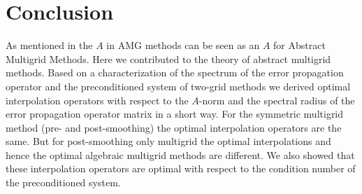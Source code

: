\documentclass[final]{siamltex}
\numberwithin{equation}{section}
\begin{document}
\section{Conclusion}
As mentioned in \cite{XuZ17} the  $A$ in AMG methods can be seen as an $A$ for 
Abstract 
Multigrid Methods. Here  we contributed to the  theory of  
abstract multigrid methods. Based on a characterization of the spectrum of the
error propagation operator and the preconditioned system of two-grid methods
we derived optimal interpolation operators with respect  to the $A$-norm and
the spectral radius of the  error propagation operator matrix in a
short way. For the symmetric multigrid method (pre- and  post-smoothing) the
optimal interpolation operators are  the same. But for post-smoothing only
multigrid the optimal interpolations and hence the optimal algebraic multigrid
methods are different. We also showed that these interpolation operators
are optimal  with respect to the condition number of the preconditioned system.







%

\end{document}

